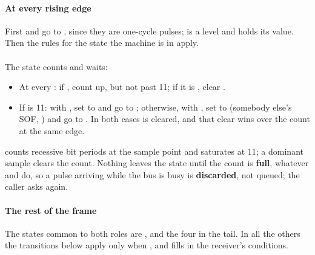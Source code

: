 \paragraph{At every rising edge}
First  and  go to , since they are one-cycle pulses;
 is a level and holds its value. Then the rules for the state the machine is in apply.

\paragraph{}
The state counts and waits:
\begin{itemize}
  \item At every : if , count  up, but not past
    11; if it is , clear .
  \item If  is 11: with , set  to  and go to
    ; otherwise, with , set  to 
    (somebody else's SOF, ) and go to . In both cases
     is cleared, and that clear wins over the count at the same edge.
\end{itemize}

 counts recessive bit periods at the sample point and saturates at 11; a dominant
sample clears the count. Nothing leaves the state until the count is \textbf{full}, whatever
 and  do, so a  pulse arriving while the bus is busy is
\textbf{discarded}, not queued; the caller asks again.

\paragraph{The rest of the frame}
The states common to both roles are ,  and the four in the
tail. In all the others the transitions below apply only when , and
 fills in the receiver's conditions.

